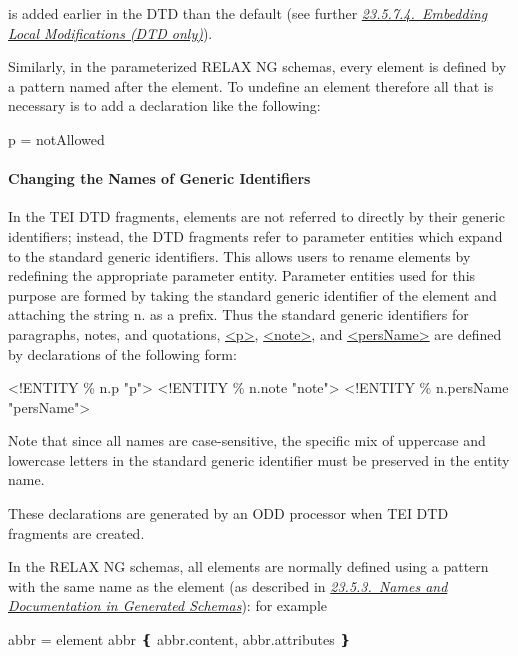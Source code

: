 \par\egroup 
 is added earlier in the DTD than the default (see further \textit{\hyperref[STOVLO]{23.5.7.4.\ Embedding Local Modifications (DTD only)}}).\par
Similarly, in the parameterized RELAX NG schemas, every element is defined by a pattern named after the element. To undefine an element therefore all that is necessary is to add a declaration like the following: \par\hfill\bgroup\exampleFont\vskip 10pt\begin{shaded}
\obeyspaces  p = notAllowed \end{shaded}
\par\egroup 

\paragraph[{Changing the Names of Generic Identifiers}]{Changing the Names of Generic Identifiers}\label{STPEGI}\par
In the TEI DTD fragments, elements are not referred to directly by their generic identifiers; instead, the DTD fragments refer to parameter entities which expand to the standard generic identifiers. This allows users to rename elements by redefining the appropriate parameter entity. Parameter entities used for this purpose are formed by taking the standard generic identifier of the element and attaching the string n. as a prefix. Thus the standard generic identifiers for paragraphs, notes, and quotations, \hyperref[TEI.p]{<p>}, \hyperref[TEI.note]{<note>}, and \hyperref[TEI.persName]{<persName>} are defined by declarations of the following form: \par\hfill\bgroup\exampleFont\vskip 10pt\begin{shaded}
\obeyspaces <!ENTITY \% n.p "p">\newline
<!ENTITY \% n.note "note"> \newline
<!ENTITY \% n.persName "persName">\end{shaded}
\par\egroup 
 Note that since all names are case-sensitive, the specific mix of uppercase and lowercase letters in the standard generic identifier must be preserved in the entity name.\par
These declarations are generated by an ODD processor when TEI DTD fragments are created. \par
In the RELAX NG schemas, all elements are normally defined using a pattern with the same name as the element (as described in \textit{\hyperref[IM-naming]{23.5.3.\ Names and Documentation in Generated Schemas}}): for example \par\hfill\bgroup\exampleFont\vskip 10pt\begin{shaded}
\obeyspaces abbr = element abbr ❴ abbr.content, abbr.attributes ❵\end{shaded}
